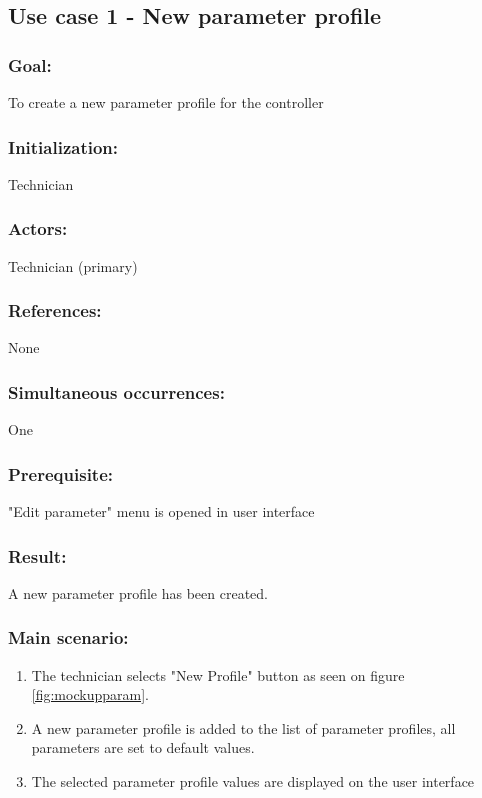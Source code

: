 \begin{framed}
	\subsection{Use case 1 - New parameter profile}
	\subsubsection*{Goal:}
	To create a new parameter profile for the controller
	
	\subsubsection*{Initialization:}
	Technician
	
	\subsubsection*{Actors:}
	Technician (primary)
	
	\subsubsection*{References:}
	None
	
	\subsubsection*{Simultaneous occurrences:}
	One
	
	\subsubsection*{Prerequisite:}
	"Edit parameter" menu is opened in user interface
	
	\subsubsection*{Result:}
	A new parameter profile has been created.
	
	\subsubsection*{Main scenario:}
	\begin{enumerate}
		\item The technician selects "New Profile" button as seen on figure \ref{fig:mockupparam}.
		\item A new parameter profile is added to the list of parameter profiles, all parameters are set to default values.
		\item The selected parameter profile values are displayed on the user interface
	\end{enumerate}	
\end{framed}

